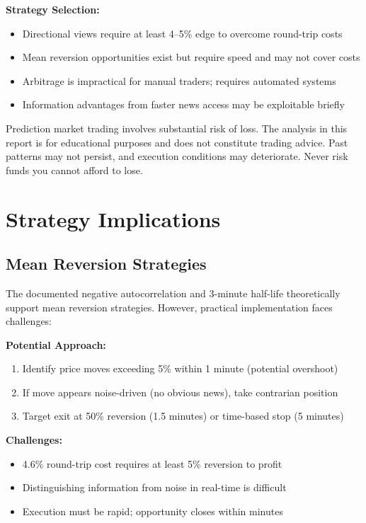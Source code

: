 \textbf{Strategy Selection:}
\begin{itemize}
    \item Directional views require at least 4--5\% edge to overcome round-trip costs
    \item Mean reversion opportunities exist but require speed and may not cover costs
    \item Arbitrage is impractical for manual traders; requires automated systems
    \item Information advantages from faster news access may be exploitable briefly
\end{itemize}

\begin{warningbox}
Prediction market trading involves substantial risk of loss. The analysis in this report is for educational purposes and does not constitute trading advice. Past patterns may not persist, and execution conditions may deteriorate. Never risk funds you cannot afford to lose.
\end{warningbox}

\section{Strategy Implications}

\subsection{Mean Reversion Strategies}

The documented negative autocorrelation and 3-minute half-life theoretically support mean reversion strategies. However, practical implementation faces challenges:

\textbf{Potential Approach:}
\begin{enumerate}
    \item Identify price moves exceeding 5\% within 1 minute (potential overshoot)
    \item If move appears noise-driven (no obvious news), take contrarian position
    \item Target exit at 50\% reversion (1.5 minutes) or time-based stop (5 minutes)
\end{enumerate}

\textbf{Challenges:}
\begin{itemize}
    \item 4.6\% round-trip cost requires at least 5\% reversion to profit
    \item Distinguishing information from noise in real-time is difficult
    \item Execution must be rapid; opportunity closes within minutes
\end{itemize}


